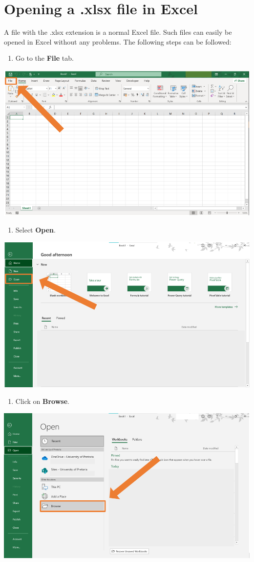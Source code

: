 \documentclass[
]{book}
\providecommand{\tightlist}{%
  \setlength{\itemsep}{0pt}\setlength{\parskip}{0pt}}
\begin{document}
\section{Opening a .xlsx file in Excel}\label{opening-a-.xlsx-file-in-excel}

A file with the .xlsx extension is a normal Excel file. Such files can easily be opened in Excel without any problems. The following steps can be followed:

\begin{enumerate}
\def\labelenumi{\arabic{enumi}.}
\tightlist
\item
  Go to the \textbf{File} tab.
\end{enumerate}

\begin{center}\includegraphics[width=0.5\linewidth]{Figures/decimal_step1} \end{center}

\begin{enumerate}
\def\labelenumi{\arabic{enumi}.}
\setcounter{enumi}{1}
\tightlist
\item
  Select \textbf{Open}.
\end{enumerate}

\begin{center}\includegraphics[width=0.5\linewidth]{Figures/import_open_1} \end{center}

\begin{enumerate}
\def\labelenumi{\arabic{enumi}.}
\setcounter{enumi}{2}
\tightlist
\item
  Click on \textbf{Browse}.
\end{enumerate}

\begin{center}\includegraphics[width=0.5\linewidth]{Figures/import_open_2} \end{center}
\end{document}
